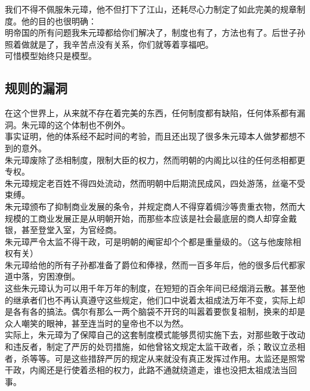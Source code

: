 \begin{multicols}{\theparacolNo}
我们不得不佩服朱元璋，他不但打下了江山，还耗尽心力制定了如此完美的规章制度。他的目的也很明确：\\

明帝国的所有问题我朱元璋都给你们解决了，制度也有了，方法也有了。后世子孙照着做就是了，我辛苦点没有关系，你们就等着享福吧。\\

可惜模型始终只是模型。\\

\subsection{规则的漏洞}
在这个世界上，从来就不存在着完美的东西，任何制度都有缺陷，任何体系都有漏洞。朱元璋的这个体制也不例外。\\

事实证明，他的体系经不起时间的考验，而且还出现了很多朱元璋本人做梦都想不到的意外。\\

朱元璋废除了丞相制度，限制大臣的权力，然而明朝的内阁比以往的任何丞相都更专权。\\

朱元璋规定老百姓不得四处流动，然而明朝中后期流民成风，四处游荡，丝毫不受束缚。\\

朱元璋颁布了抑制商业发展的条令，并规定商人不得穿着绸沙等贵重衣物，然而大规模的工商业发展正是从明朝开始，而那些本应该是社会最底层的商人却穿金戴银，甚至登堂入室，为官经商。\\

朱元璋严令太监不得干政，可是明朝的阉宦却个个都是重量级的。（这与他废除相权有关）\\

朱元璋给他的所有子孙都准备了爵位和俸禄，然而一百多年后，他的很多后代都家道中落，穷困潦倒。\\

这些朱元璋认为可以用千年万年的制度，在短短的百余年间已经烟消云散。甚至他的继承者们也不再认真遵守这些规定，他们口中说着太祖成法万年不变，实际上却是各有各的搞法。偶尔有那么一两个脑袋不开窍的叫嚣着要恢复祖制，换来的却是众人嘲笑的眼神，甚至连当时的皇帝也不以为然。\\

实际上，朱元璋为了保障自己的这套制度模式能够贯彻实施下去，对那些敢于改动和违反者，制定了严厉的处罚措施，如他曾铭文规定太监干政者，杀；敢议立丞相者，杀等等。可是这些措辞严厉的规定从来就没有真正发挥过作用。太监还是照常干政，内阁还是行使着丞相的权力，此路不通就绕道走，谁也没把太祖成法当回事。\\


\end{multicols}
